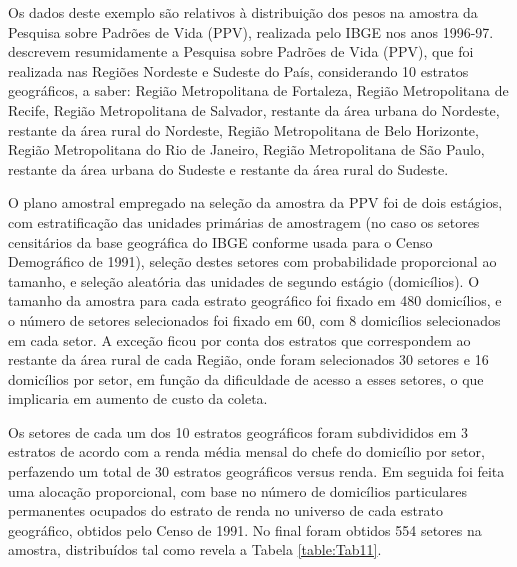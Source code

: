 \documentclass[]{book}
\numberwithin{example}{chapter}
\numberwithin{remark}{chapter}
\numberwithin{definition}{chapter}
\begin{document}
Os dados deste exemplo são relativos à distribuição dos pesos na amostra
da Pesquisa sobre Padrões de Vida (PPV), realizada pelo IBGE nos anos
1996-97. \citep{albieri} descrevem resumidamente a Pesquisa sobre
Padrões de Vida (PPV), que foi realizada nas Regiões Nordeste e Sudeste
do País, considerando 10 estratos geográficos, a saber: Região
Metropolitana de Fortaleza, Região Metropolitana de Recife, Região
Metropolitana de Salvador, restante da área urbana do Nordeste, restante
da área rural do Nordeste, Região Metropolitana de Belo Horizonte,
Região Metropolitana do Rio de Janeiro, Região Metropolitana de São
Paulo, restante da área urbana do Sudeste e restante da área rural do
Sudeste.

O plano amostral empregado na seleção da amostra da PPV foi de dois
estágios, com estratificação das unidades primárias de amostragem (no
caso os setores censitários da base geográfica do IBGE conforme usada
para o Censo Demográfico de 1991), seleção destes setores com
probabilidade proporcional ao tamanho, e seleção aleatória das unidades
de segundo estágio (domicílios). O tamanho da amostra para cada estrato
geográfico foi fixado em 480 domicílios, e o número de setores
selecionados foi fixado em 60, com 8 domicílios selecionados em cada
setor. A exceção ficou por conta dos estratos que correspondem ao
restante da área rural de cada Região, onde foram selecionados 30
setores e 16 domicílios por setor, em função da dificuldade de acesso a
esses setores, o que implicaria em aumento de custo da coleta.

Os setores de cada um dos 10 estratos geográficos foram subdivididos em
3 estratos de acordo com a renda média mensal do chefe do domicílio por
setor, perfazendo um total de 30 estratos geográficos versus renda. Em
seguida foi feita uma alocação proporcional, com base no número de
domicílios particulares permanentes ocupados do estrato de renda no
universo de cada estrato geográfico, obtidos pelo Censo de 1991. No
final foram obtidos 554 setores na amostra, distribuídos tal como revela
a Tabela \ref{table:Tab11}.
\end{document}
